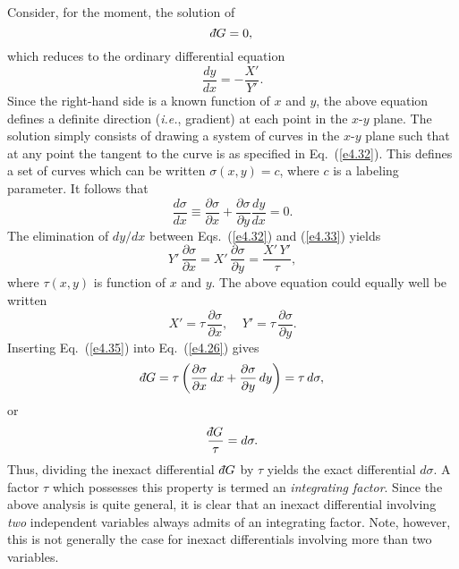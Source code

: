 Consider, for the moment, the solution of 
\begin{equation}
\dbar G = 0,
\end{equation}
which reduces to the ordinary differential equation
\begin{equation}
\frac{dy}{dx} = -\frac{X'}{Y'}.\label{e4.32}
\end{equation}
Since the right-hand side is a known function of $x$ and $y$, the above
equation defines
a definite direction ({\em i.e.}, gradient) at each point in the $x$-$y$ plane. The
solution  simply consists of drawing a system of curves in the
$x$-$y$ plane such that at any point the tangent to the curve is as specified
in Eq.~(\ref{e4.32}). This defines a set of curves which can be written
$\sigma (x, y) = c$, where $c$ is a labeling parameter.
It follows that
\begin{equation}
\frac{d\sigma}{d x}\equiv \frac{\partial \sigma}{\partial x}
+\frac{\partial\sigma}{\partial y}\frac{dy}{dx} = 0.\label{e4.33}
\end{equation}
The elimination of $dy/dx$ between Eqs.~(\ref{e4.32}) and (\ref{e4.33}) yields
\begin{equation}
Y'\, \frac{\partial \sigma}{\partial x} = X'\, \frac{\partial\sigma}{\partial y}
=\frac{X' \,Y'}{\tau},
\end{equation}
where $\tau(x, y)$ is function of $x$ and $y$. The above equation could equally
well be written
\begin{equation}
X' = \tau\, \frac{\partial \sigma}{\partial x},~~~~~Y' = \tau\,
 \frac{\partial \sigma}
{\partial y}.\label{e4.35}
\end{equation}
Inserting Eq.~(\ref{e4.35}) into Eq.~(\ref{e4.26}) gives
\begin{equation}
\dbar G = \tau \left( \frac{\partial \sigma}{\partial x}\,dx + \frac{\partial\sigma}
{\partial y}\,dy\right)= \tau\,d\sigma,
\end{equation}
or
\begin{equation}
\frac{\dbar G}{\tau} = d\sigma.
\end{equation}
Thus, dividing the inexact differential $\,\dbar G$ by $\tau$ yields the exact
differential $d\sigma$. A factor $\tau$ which possesses this property is
termed an {\em integrating factor}. Since the above analysis is quite general,
it is clear that an inexact differential involving {\em two}\/ independent variables always
admits of an integrating factor. Note, however, 
this is not generally the case for inexact
differentials involving  more than two variables.

